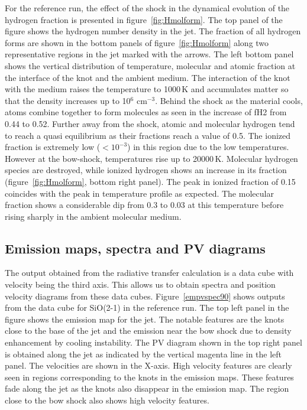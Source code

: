 \documentclass[useAMS,usenatbib]{mn2e}
\begin{document}
For the reference run, the effect of the shock in the dynamical evolution of
the hydrogen fraction is presented in figure~\ref{fig:Hmolform}. The top
panel of the figure shows the hydrogen number density in the jet. 
The fraction of all hydrogen forms are shown in the bottom
panels of figure~\ref{fig:Hmolform} along two representative regions in
the jet marked with the arrows. The left bottom panel shows the
vertical distribution of temperature, molecular and atomic fraction at the
interface of the knot and the ambient medium. The interaction of the
knot with the medium raises the temperature to 1000\,K and
accumulates matter so that the density increases up to
10$^{6}$ cm$^{-3}$. Behind the shock as the material cools, atoms
combine together to form molecules as seen in the increase of fH2 from
0.44 to 0.52. Further away from the
shock, atomic and molecular hydrogen tend to reach a quasi equilibrium as their
fractions reach a value of 0.5. The ionized fraction is
extremely low ($< 10^{-3}$) in this region due to the low temperatures. However at the
bow-shock, temperatures rise up to 20000\,K. Molecular
hydrogen species are destroyed, while ionized hydrogen shows an
increase in its fraction 
(figure~\ref{fig:Hmolform}, bottom right panel). The peak in ionized fraction of 0.15
coincides with the peak in temperature profile as expected. The
molecular fraction shows a considerable dip from 0.3 to 0.03 at 
this temperature before rising sharply in the ambient molecular
medium. 
%

\subsection{Emission maps, spectra and PV diagrams}
\label{ssec:emspecpv}
The output obtained from the radiative transfer calculation is a data
cube with velocity being the third axis. This allows us to obtain
spectra and position velocity diagrams from these data cubes. 
Figure~\ref{empvspec90} shows outputs from the data
cube for SiO(2-1) in the reference run. 
The top left panel in the figure shows the emission map for the jet. The notable features are the knots close to the
base of the jet and the emission near the bow shock due to density
enhancement by cooling instability. The PV diagram shown in the top
right panel is obtained along the jet as indicated by the vertical magenta
line in the left panel. The velocities are shown in the X-axis. High velocity features
are clearly seen in regions corresponding to the knots in the emission
maps. These features fade along the jet as the knots also disappear in
the emission map. The region close to the bow shock also shows high
velocity features.
%
\end{document}
